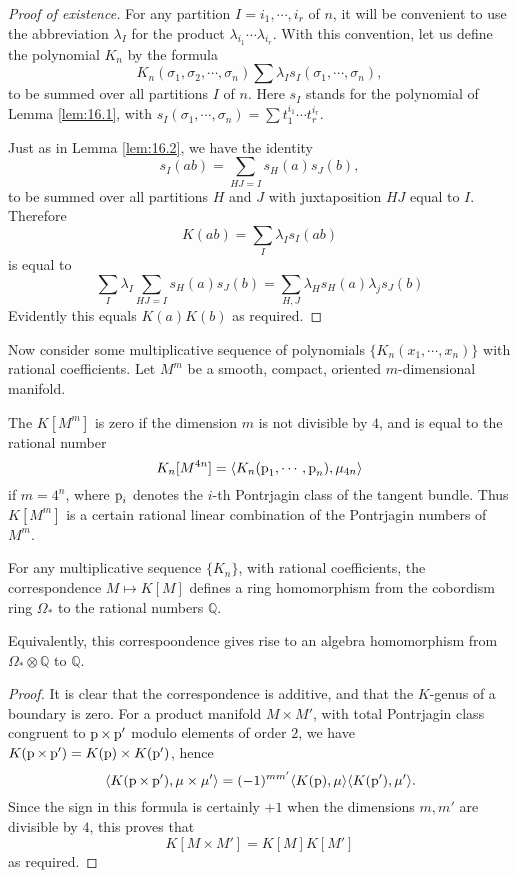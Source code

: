 \documentclass[../main]{subfiles}
\begin{document}
\begin{proof}[Proof of existence]
For any partition $I = i_1,\cdots,i_r$ of $n$, it will be convenient to use the abbreviation $\lambda_I$ for the product $\lambda_{i_1} \cdots \lambda_{i_r}$. With this convention, let us define the polynomial $K_n$ by the formula \[K_n(\sigma_1,\sigma_2,\cdots,\sigma_n) \sum \lambda_I s_I(\sigma_1,\cdots,\sigma_n),\] to be summed over all partitions $I$ of $n$. Here $s_I$ stands for the polynomial of Lemma \ref{lem:16.1}, with $s_I(\sigma_1,\cdots,\sigma_n) = \sum t_1^{i_1}\cdots t_r^{i_r}$.

Just as in Lemma \ref{lem:16.2}, we have the identity \[s_I(ab) = \sum_{HJ = I} s_H(a) s_J(b),\] to be summed over all partitions $H$ and $J$ with juxtaposition $HJ$ equal to $I$. Therefore \[K(ab) = \sum_I \lambda_I s_I(ab)\] is equal to \[\sum_I \lambda_I \sum_{HJ = I} s_H(a)s_J(b) = \sum_{H,J} \lambda_H s_H(a)\lambda_j s_J(b)\] Evidently this equals $K(a)K(b)$ as required.
\end{proof}
Now consider some multiplicative sequence of polynomials $\{K_n(x_1,\cdots,x_n)\}$ with rational coefficients. Let $M^m$ be a smooth, compact, oriented $m$-dimensional manifold.

\begin{definition}
The  $K[M^m]$ is zero if the dimension $m$ is not divisible by $4$, and is equal to the rational number \[K_n[M^{4n}] = \langle K_n(\operatorname{p}_1,\cdots,\operatorname{p}_n),\mu_{4n} \rangle \] if $m=4^n$, where $\operatorname{p}_i$ denotes the $i$-th Pontrjagin class of the tangent bundle. Thus $K[M^m]$ is a certain rational linear combination of the Pontrjagin numbers of $M^m$.
\end{definition}
\begin{lemma}
\label{lem:19.02}
For any multiplicative sequence $\{K_n\}$, with rational coefficients, the correspondence $M \mapsto K[M]$ defines a ring homomorphism from the cobordism ring $\Omega_\ast$ to the rational numbers $\mathbb{Q}$.
\end{lemma}
Equivalently, this correspoondence gives rise to an algebra homomorphism from $\Omega_\ast \otimes \mathbb{Q}$ to $\mathbb{Q}$.
\begin{proof}
It is clear that the correspondence is additive, and that the $K$-genus of a boundary is zero. For a product manifold $M \times M'$, with total Pontrjagin class congruent to $\operatorname{p} \times \operatorname{p}'$ modulo elements of order $2$, we have \newline $K(\operatorname{p} \times \operatorname{p}') = K(\operatorname{p}) \times K(\operatorname{p}')$, hence 
\[\langle K(\operatorname{p} \times \operatorname{p}'), \mu \times \mu' \rangle = (-1)^{mm'} \langle K(\operatorname{p}),\mu \rangle \langle K(\operatorname{p}'),\mu' \rangle .\] Since the sign in this formula is certainly $+1$ when the dimensions $m,m'$ are divisible by $4$, this proves that \[K[M \times M'] = K[M]K[M']\] as required.
\end{proof}
\end{document}
